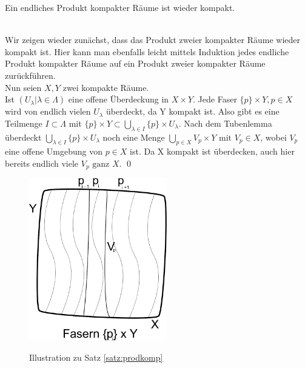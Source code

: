 \begin{Satz}\label{satz:prodkomp}
	Ein endliches Produkt kompakter Räume ist wieder kompakt.
\end{Satz}
	\\
	Wir zeigen wieder zunächst, dass das Produkt zweier kompakter Räume wieder kompakt ist. Hier kann man ebenfalls leicht mittels Induktion jedes endliche Produkt kompakter Räume 
	auf ein Produkt zweier kompakter Räume zurückführen. \\
	Nun seien \(X, Y\) zwei kompakte Räume.\\
	Ist \((U_{\lambda} | \lambda \in \Lambda) \) eine offene Überdeckung in \(X \times Y \). Jede Faser \( \{p\} \times Y, p \in X \) wird von endlich vielen \(U_{\lambda} \) überdeckt,
	da Y kompakt ist. Also gibt es eine Teilmenge \( I \subset \Lambda \) mit \( \{p\} \times Y \subset \bigcup_{ \lambda \in I } \{p\} \times U_{\lambda} \). 
	Nach dem Tubenlemma überdeckt \( \bigcup_{ \lambda \in I } \{p\} \times U_{\lambda} \) noch eine Menge \(\bigcup_{ p \in X } V_{p} \times Y \mbox{ mit } V_{p} \in X \),
	 wobei \( V_{p} \) eine offene Umgebung von \( p \in X \) ist. Da X kompakt ist überdecken, auch hier bereits endlich viele \(V_{p} \mbox{ ganz } X \). 
\qed

\begin{figure}[ht]
	\centering
	\includegraphics[width=6cm]{produkt_kompakter_raueme.pdf}
	\label{fig:satzprodkomp}
	\caption{Illustration zu Satz \ref{satz:prodkomp}}
\end{figure}
	
